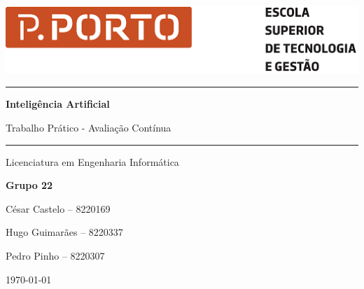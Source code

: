 \documentclass[12pt,a4paper,titlepage]{article}
\begin{document}
\begin{titlepage}
    \centering
    \includegraphics[width=15cm]{imagens/estg_logo.png}\par\vspace{0.9cm} %
    \scshape %
    
    \rule{\textwidth}{1pt}\vspace{0.4cm} %
    {\Huge \bfseries Inteligência Artificial \par}
    {Trabalho Prático - Avaliação Contínua \par}
    \vspace{0.4cm}\rule{\textwidth}{1pt}\par
    \vspace{2cm}
    
    \Large Licenciatura em Engenharia Informática \par
    \vspace{4cm}

    \normalsize
    \textbf{Grupo 22} \par
    César Castelo – 8220169 \par
    Hugo Guimarães – 8220337 \par
    Pedro Pinho – 8220307 \par
    \vfill

    \large \today
\end{titlepage}


\tableofcontents
\newpage

\renewcommand{\listfigurename}{Índice de Figuras}
\listoffigures
{}
\newpage






\newpage




\end{document}
